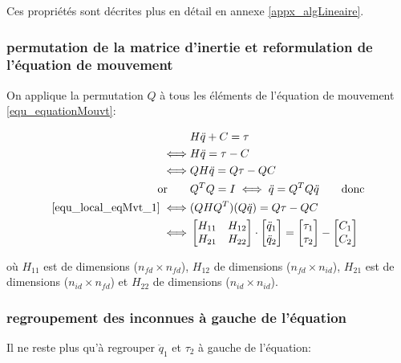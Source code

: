 \documentclass{report}
\begin{document}
Ces propriétés sont décrites plus en détail en annexe \ref{appx_algLineaire}.

\subsubsection{permutation de la matrice d'inertie et reformulation de l'équation de mouvement}

On applique la permutation $Q$ à tous les éléments de l'équation de mouvement \eqref{equ_equationMouvt}:
\begin{spacing}{1.5}
\begin{align}
&H \ddot{q} + C = \tau \notag \\
\iff &H \ddot{q} = \tau - C \notag \\
\iff &Q H \ddot{q} = Q \tau - Q C \label{equ_local_eqMvt_1} \\
\textnormal{or} \qquad &Q^T Q = I \iff \ddot{q} = Q^T Q \ddot{q} \qquad \textnormal{donc} \notag \\
\eqref{equ_local_eqMvt_1} \iff &(Q H Q^T) (Q \ddot{q}) = Q \tau - Q C \notag \\
\iff 
&\begin{bmatrix}
  H_{11} & H_{12} \\
  H_{21} & H_{22}
\end{bmatrix} 
\cdot
\begin{bmatrix}
  \ddot{q}_{1} \\
  \ddot{q}_{2}
\end{bmatrix} 
= 
\begin{bmatrix}
  \tau_{1} \\
  \tau_{2}
\end{bmatrix} 
-
\begin{bmatrix}
  C_{1} \\
  C_{2}
\end{bmatrix} \label{equ_local_eqMvt_2}
\end{align}
\end{spacing}

où $H_{11}$ est de dimensions ($n_{fd} \times n_{fd}$), $H_{12}$ de dimensions ($n_{fd} \times n_{id}$), $H_{21}$ est de dimensions ($n_{id} \times n_{fd}$) et $H_{22}$ de dimensions ($n_{id} \times n_{id}$).
\subsubsection{regroupement des inconnues à gauche de l'équation}

Il ne reste plus qu'à regrouper $\ddot{q}_1$ et $\tau_2$ à gauche de l'équation:
\end{document}
